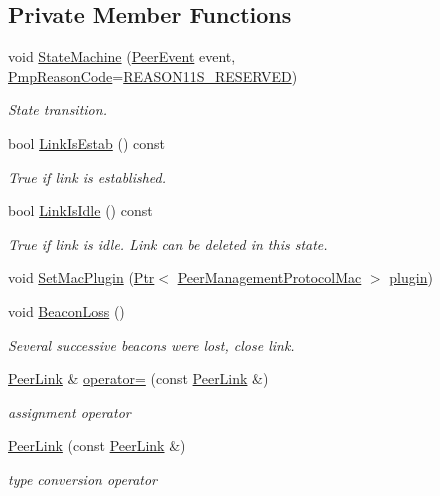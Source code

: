\subsection*{Private Member Functions}
\begin{DoxyCompactItemize}
\item 
void \hyperlink{classns3_1_1dot11s_1_1PeerLink_a4cc26e7fdbef0daafd1f6cc7d89fdd01}{State\+Machine} (\hyperlink{classns3_1_1dot11s_1_1PeerLink_ac43c14ad12c9ea15604be0ee70ab6b90}{Peer\+Event} event, \hyperlink{group__dot11s_ga1132ec5975c87960ceb86ea54481aba6}{Pmp\+Reason\+Code}=\hyperlink{group__dot11s_gga1132ec5975c87960ceb86ea54481aba6a1e76395872503ccadd9cf008e325b3d8}{R\+E\+A\+S\+O\+N11\+S\+\_\+\+R\+E\+S\+E\+R\+V\+ED})
\begin{DoxyCompactList}\small\item\em State transition. \end{DoxyCompactList}\item 
bool \hyperlink{classns3_1_1dot11s_1_1PeerLink_a87b8a287ea8fd4317319aad1c7430c9b}{Link\+Is\+Estab} () const 
\begin{DoxyCompactList}\small\item\em True if link is established. \end{DoxyCompactList}\item 
bool \hyperlink{classns3_1_1dot11s_1_1PeerLink_a506c5a64bd63962e3b19fb5f85d70531}{Link\+Is\+Idle} () const 
\begin{DoxyCompactList}\small\item\em True if link is idle. Link can be deleted in this state. \end{DoxyCompactList}\item 
void \hyperlink{classns3_1_1dot11s_1_1PeerLink_a988f8fff998bfcaaa94276828cb21a3a}{Set\+Mac\+Plugin} (\hyperlink{classns3_1_1Ptr}{Ptr}$<$ \hyperlink{classns3_1_1dot11s_1_1PeerManagementProtocolMac}{Peer\+Management\+Protocol\+Mac} $>$ \hyperlink{visualizer-ideas_8txt_a82212ee380150b652f4dad598413d06f}{plugin})
\item 
void \hyperlink{classns3_1_1dot11s_1_1PeerLink_a70cf99acca46134ddf0f1b6c5baf76f5}{Beacon\+Loss} ()
\begin{DoxyCompactList}\small\item\em Several successive beacons were lost, close link. \end{DoxyCompactList}\item 
\hyperlink{classns3_1_1dot11s_1_1PeerLink}{Peer\+Link} \& \hyperlink{classns3_1_1dot11s_1_1PeerLink_a97e0b7eb853ae2578088cc7eb42d7935}{operator=} (const \hyperlink{classns3_1_1dot11s_1_1PeerLink}{Peer\+Link} \&)
\begin{DoxyCompactList}\small\item\em assignment operator \end{DoxyCompactList}\item 
\hyperlink{classns3_1_1dot11s_1_1PeerLink_a742f8668b16b9ea12b2b03950e5cd27d}{Peer\+Link} (const \hyperlink{classns3_1_1dot11s_1_1PeerLink}{Peer\+Link} \&)
\begin{DoxyCompactList}\small\item\em type conversion operator \end{DoxyCompactList}\end{DoxyCompactItemize}
